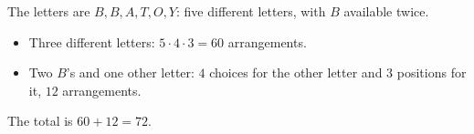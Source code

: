 The letters are $B,B,A,T,O,Y$: five different letters, with $B$ available twice.
\begin{itemize}
\item Three different letters: $5\cdot4\cdot3=60$ arrangements.
\item Two $B$'s and one other letter: $4$ choices for the other letter and $3$ positions for it, $12$ arrangements.
\end{itemize}
The total is $60+12=\boxed{72}$.
